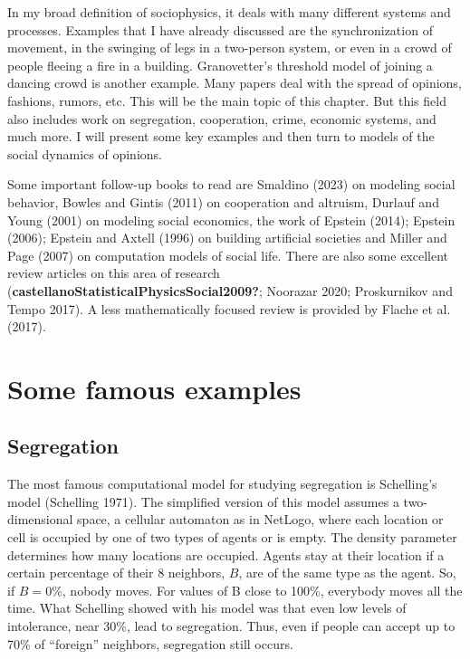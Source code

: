 \documentclass[
  letterpaper,
]{scrbook}
\begin{document}
In my broad definition of sociophysics, it deals with many different
systems and processes. Examples that I have already discussed are the
synchronization of movement, in the swinging of legs in a two-person
system, or even in a crowd of people fleeing a fire in a building.
Granovetter's threshold model of joining a dancing crowd is another
example. Many papers deal with the spread of opinions, fashions, rumors,
etc. This will be the main topic of this chapter. But this field also
includes work on segregation, cooperation, crime, economic systems, and
much more. I will present some key examples and then turn to models of
the social dynamics of opinions.

Some important follow-up books to read are Smaldino (2023) on modeling
social behavior, Bowles and Gintis (2011) on cooperation and altruism,
Durlauf and Young (2001) on modeling social economics, the work of
Epstein (2014); Epstein (2006); Epstein and Axtell (1996) on building
artificial societies and Miller and Page (2007) on computation models of
social life. There are also some excellent review articles on this area
of research (\textbf{castellanoStatisticalPhysicsSocial2009?}; Noorazar
2020; Proskurnikov and Tempo 2017). A less mathematically focused review
is provided by Flache et al. (2017).

\hypertarget{some-famous-examples}{%
\section{Some famous examples}\label{some-famous-examples}}

\hypertarget{segregation}{%
\subsection{Segregation}\label{segregation}}

The most famous computational model for studying segregation is
Schelling's model (Schelling 1971). The simplified version of this model
assumes a two-dimensional space, a cellular automaton as in NetLogo,
where each location or cell is occupied by one of two types of agents or
is empty. The density parameter determines how many locations are
occupied. Agents stay at their location if a certain percentage of their
8 neighbors, \(B\), are of the same type as the agent. So, if
\(B = 0\%\), nobody moves. For values of B close to 100\%, everybody
moves all the time. What Schelling showed with his model was that even
low levels of intolerance, near 30\%, lead to segregation. Thus, even if
people can accept up to 70\% of ``foreign'' neighbors, segregation still
occurs.
\end{document}
